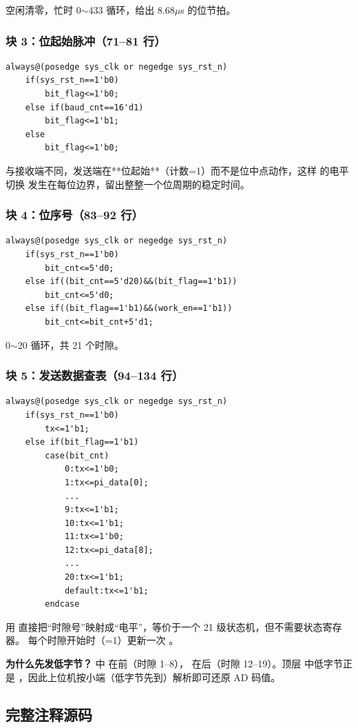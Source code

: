 空闲清零，忙时 0$\sim$433 循环，给出 8.68$\mu$s 的位节拍。

\subsubsection{块 3：位起始脉冲（71--81 行）}

\begin{lstlisting}[style=vsnip]
always@(posedge sys_clk or negedge sys_rst_n)
    if(sys_rst_n==1'b0)
        bit_flag<=1'b0;
    else if(baud_cnt==16'd1)
        bit_flag<=1'b1;
    else
        bit_flag<=1'b0;
\end{lstlisting}

与接收端不同，发送端在**位起始**（计数=1）而不是位中点动作，这样  的电平切换
发生在每位边界，留出整整一个位周期的稳定时间。

\subsubsection{块 4：位序号（83--92 行）}

\begin{lstlisting}[style=vsnip]
always@(posedge sys_clk or negedge sys_rst_n)
    if(sys_rst_n==1'b0)
        bit_cnt<=5'd0;
    else if((bit_cnt==5'd20)&&(bit_flag==1'b1))
        bit_cnt<=5'd0;
    else if((bit_flag==1'b1)&&(work_en==1'b1))
        bit_cnt<=bit_cnt+5'd1;
\end{lstlisting}

0$\sim$20 循环，共 21 个时隙。

\subsubsection{块 5：发送数据查表（94--134 行）}

\begin{lstlisting}[style=vsnip]
always@(posedge sys_clk or negedge sys_rst_n)
    if(sys_rst_n==1'b0)
        tx<=1'b1;
    else if(bit_flag==1'b1)
        case(bit_cnt)
            0:tx<=1'b0;
            1:tx<=pi_data[0];
            ...
            9:tx<=1'b1;
            10:tx<=1'b1;
            11:tx<=1'b0;
            12:tx<=pi_data[8];
            ...
            20:tx<=1'b1;
            default:tx<=1'b1;
        endcase
\end{lstlisting}

用  直接把“时隙号”映射成“电平”，等价于一个 21 级状态机，但不需要状态寄存器。
每个时隙开始时（=1）更新一次 。

\begin{tipbox}
\textbf{为什么先发低字节？}  中  在前（时隙 1--8），
 在后（时隙 12--19）。顶层 
中低字节正是 ，因此上位机按小端（低字节先到）解析即可还原 AD 码值。
\end{tipbox}

\subsection{完整注释源码}


